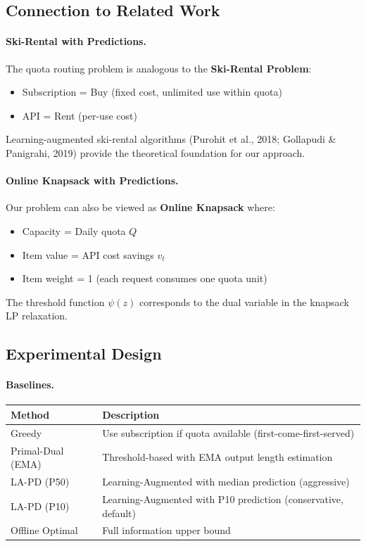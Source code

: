 \documentclass[11pt]{article}
\begin{document}
\subsection{Connection to Related Work}

\paragraph{Ski-Rental with Predictions.}
The quota routing problem is analogous to the \textbf{Ski-Rental Problem}:
\begin{itemize}
  \item Subscription = Buy (fixed cost, unlimited use within quota)
  \item API = Rent (per-use cost)
\end{itemize}

Learning-augmented ski-rental algorithms (Purohit et al., 2018; Gollapudi \& Panigrahi, 2019) provide the theoretical foundation for our approach.

\paragraph{Online Knapsack with Predictions.}
Our problem can also be viewed as \textbf{Online Knapsack} where:
\begin{itemize}
  \item Capacity = Daily quota $Q$
  \item Item value = API cost savings $v_t$
  \item Item weight = 1 (each request consumes one quota unit)
\end{itemize}

The threshold function $\psi(z)$ corresponds to the dual variable in the knapsack LP relaxation.

\subsection{Experimental Design}

\paragraph{Baselines.}
\begin{center}
\begin{tabular}{|l|l|}
\hline
\textbf{Method} & \textbf{Description} \\
\hline
Greedy & Use subscription if quota available (first-come-first-served) \\
Primal-Dual (EMA) & Threshold-based with EMA output length estimation \\
LA-PD (P50) & Learning-Augmented with median prediction (aggressive) \\
LA-PD (P10) & Learning-Augmented with P10 prediction (conservative, default) \\
Offline Optimal & Full information upper bound \\
\hline
\end{tabular}
\end{center}
\end{document}
